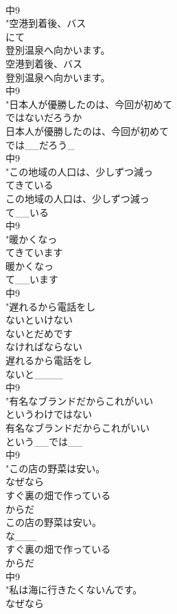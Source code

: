 \documentclass[8pt]{extreport}
\begin{document}
\begin{CJK}{UTF8}{min}
\\	中9
\\	"空港到着後、バス
\\	にて
\\	登別温泉へ向かいます。
\\	空港到着後、バス
\\	登別温泉へ向かいます。
\\	中9
\\	"日本人が優勝したのは、今回が初めて
\\	ではないだろうか
\\	日本人が優勝したのは、今回が初めて
\\	では__だろう_
\\	中9
\\	"この地域の人口は、少しずつ減っ
\\	てきている
\\	この地域の人口は、少しずつ減っ
\\	て__いる
\\	中9
\\	"暖かくなっ
\\	てきています
\\	暖かくなっ
\\	て__います
\\	中9
\\	"遅れるから電話をし
\\	ないといけない
\\	ないとだめです
\\	なければならない	
\\	遅れるから電話をし
\\	ないと____
\\	中9
\\	"有名なブランドだからこれがいい
\\	というわけではない
\\	有名なブランドだからこれがいい
\\	という__では__
\\	中9
\\	"この店の野菜は安い。
\\	なぜなら
\\	すぐ裏の畑で作っている
\\	からだ
\\	この店の野菜は安い。
\\	な___
\\	すぐ裏の畑で作っている
\\	からだ
\\	中9
\\	"私は海に行きたくないんです。
\\	なぜなら

\end{CJK}
\end{document}
